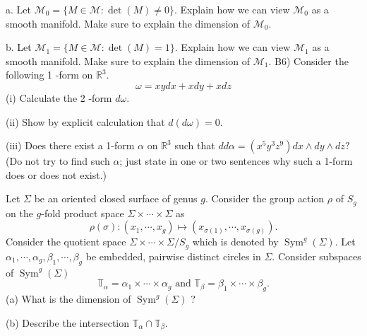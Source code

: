 \documentclass[14pt]{extarticle}
\begin{document}
a. Let $\mathcal{M}_{0}=\{M \in \mathcal{M}: \operatorname{det}(M) \neq 0\}$. Explain how we can view $\mathcal{M}_{0}$ as a smooth manifold. Make sure to explain the dimension of $\mathcal{M}_{0}$.

b. Let $\mathcal{M}_{1}=\{M \in \mathcal{M}: \operatorname{det}(M)=1\}$. Explain how we can view $\mathcal{M}_{1}$ as a smooth manifold. Make sure to explain the dimension of $\mathcal{M}_{1}$.
\newpage
B6) Consider the following 1 -form on $\mathbb{R}^{3}$.
$$
\omega=x y d x+x d y+x d z
$$
(i) Calculate the 2 -form $d \omega$.

(ii) Show by explicit calculation that $d(d \omega)=0$.

(iii) Does there exist a 1-form $\alpha$ on $\mathbb{R}^{3}$ such that $d d \alpha=\left(x^{5} y^{3} z^{9}\right) d x \wedge d y \wedge d z ?$ (Do not try to find such $\alpha$; just state in one or two sentences why such a 1-form does or does not exist.)

\newpage
Let $\Sigma$ be an oriented closed surface of genus $g$. Consider the group action $\rho$ of $S_{g}$ on the $g$-fold product space $\Sigma \times \cdots \times \Sigma$ as
$$
\rho(\sigma):\left(x_{1}, \cdots, x_{g}\right) \mapsto\left(x_{\sigma(1)}, \cdots, x_{\sigma(g)}\right) .
$$
Consider the quotient space $\Sigma \times \cdots \times \Sigma / S_{g}$ which is denoted by $\operatorname{Sym}^{g}(\Sigma)$. Let $\alpha_{1}, \cdots, \alpha_{g}, \beta_{1}, \cdots, \beta_{g}$ be embedded, pairwise distinct circles in $\Sigma$. Consider subspaces of $\operatorname{Sym}^{g}(\Sigma)$
$$
\mathbb{T}_{\alpha}=\alpha_{1} \times \cdots \times \alpha_{g} \text { and } \mathbb{T}_{\beta}=\beta_{1} \times \cdots \times \beta_{g} .
$$
(a) What is the dimension of $\operatorname{Sym}^{g}(\Sigma)$ ?

(b) Describe the intersection $\mathbb{T}_{\alpha} \cap \mathbb{T}_{\beta}$.
\end{document}
